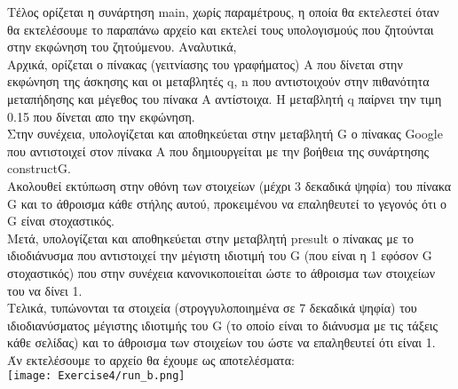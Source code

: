 \documentclass[a4paper,11pt]{article}
\newcommand{\lt}{\latintext}
\begin{document}
Τέλος ορίζεται η συνάρτηση {\lt main}, χωρίς παραμέτρους, η οποία θα εκτελεστεί όταν θα εκτελέσουμε το παραπάνω αρχείο και εκτελεί τους υπολογισμούς που ζητούνται στην εκφώνηση του ζητούμενου. Αναλυτικά,\\
Αρχικά, ορίζεται ο πίνακας (γειτνίασης του γραφήματος) Α που δίνεται στην εκφώνηση της άσκησης και οι μεταβλητές {\lt q, n} που αντιστοιχούν στην πιθανότητα μεταπήδησης και μέγεθος του πίνακα Α αντίστοιχα. Η μεταβλητή {\lt q} παίρνει την τιμη 0.15 που δίνεται απο την εκφώνηση.\\
Στην συνέχεια, υπολογίζεται και αποθηκεύεται στην μεταβλητή {\lt G} ο πίνακας {\lt Google} που αντιστοιχεί στον πίνακα Α που δημιουργείται με την βοήθεια της συνάρτησης {\lt construct\textunderscore G}.\\
Ακολουθεί εκτύπωση στην οθόνη των στοιχείων (μέχρι 3 δεκαδικά ψηφία) του πίνακα {\lt G} και το άθροισμα κάθε στήλης αυτού, προκειμένου να επαληθευτεί το γεγονός ότι ο {\lt G} είναι στοχαστικός.\\
Μετά, υπολογίζεται και αποθηκεύεται στην μεταβλητή {\lt p\textunderscore result} ο πίνακας με το ιδιοδιάνυσμα που αντιστοιχεί την μέγιστη ιδιοτιμή του {\lt G} (που είναι η 1 εφόσον {\lt G} στοχαστικός) που στην συνέχεια κανονικοποιείται ώστε το άθροισμα των στοιχείων του να δίνει 1.\\
Τελικά, τυπώνονται τα στοιχεία (στρογγυλοποιημένα σε 7 δεκαδικά ψηφία) του ιδιοδιανύσματος μέγιστης ιδιοτιμής του {\lt G} (το οποίο είναι το διάνυσμα με τις τάξεις κάθε σελίδας) και το άθροισμα των στοιχείων του ώστε να επαληθευτεί ότι είναι 1.\\

Άν εκτελέσουμε το αρχείο θα έχουμε ως αποτελέσματα:\\
\texttt{[image: Exercise4/run\_b.png]}\\
\end{document}
